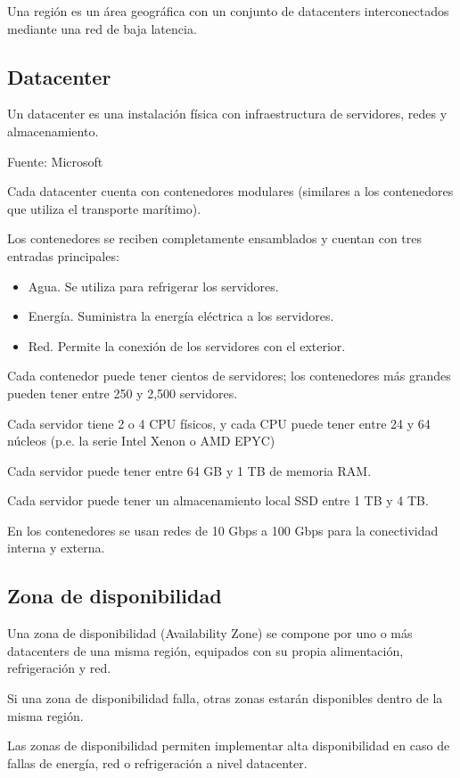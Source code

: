 Una región es un área geográfica con un conjunto de datacenters interconectados mediante una red de baja latencia.

\subsection{Datacenter}

Un datacenter es una instalación física con infraestructura de servidores, redes y almacenamiento.

Fuente: Microsoft

Cada datacenter cuenta con contenedores modulares (similares a los contenedores que utiliza el transporte marítimo).

Los contenedores se reciben completamente ensamblados y cuentan con tres entradas principales:

\begin{itemize}
\item Agua. Se utiliza para refrigerar los servidores.
\item Energía. Suministra la energía eléctrica a los servidores.
\item Red. Permite la conexión de los servidores con el exterior.
\end{itemize}

Cada contenedor puede tener cientos de servidores; los contenedores más grandes pueden tener entre 250 y 2,500 servidores.

Cada servidor tiene 2 o 4 CPU físicos, y cada CPU puede tener entre 24 y 64 núcleos (p.e. la serie Intel Xenon o AMD EPYC)

Cada servidor puede tener entre 64 GB y 1 TB de memoria RAM.

Cada servidor puede tener un almacenamiento local SSD entre 1 TB y 4 TB.

En los contenedores se usan redes de 10 Gbps a 100 Gbps para la conectividad interna y externa.

\subsection{Zona de disponibilidad}

Una zona de disponibilidad (Availability Zone) se compone por uno o más datacenters de una misma región, equipados con su propia alimentación, refrigeración y red.

Si una zona de disponibilidad falla, otras zonas estarán disponibles dentro de la misma región.

Las zonas de disponibilidad permiten implementar alta disponibilidad en caso de fallas de energía, red o refrigeración a nivel datacenter.

